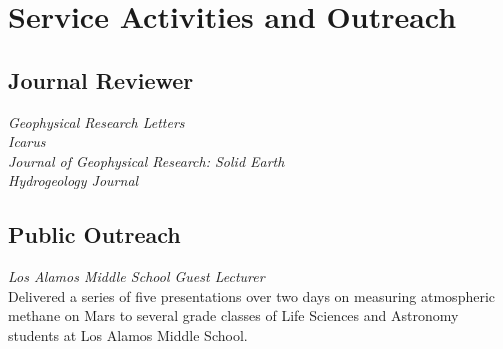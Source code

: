 \documentclass[11pt, letterpaper]{article}
\newcommand{\years}[1]{\marginnote{\scriptsize #1}}
\begin{document}
{{%

\section*{Service Activities and Outreach}

\hypersetup{linkcolor=black,citecolor=blue,filecolor=black,urlcolor=black}

% 




\subsection*{Journal Reviewer}

	\textit{Geophysical Research Letters}\\
	\textit{Icarus}\\
	\textit{Journal of Geophysical Research: Solid Earth}\\
	\textit{Hydrogeology Journal}



\subsection*{Public Outreach}
\setlength{\parskip}{0pt}
\noindent
\years{April 2024} \textit{Los Alamos Middle School Guest Lecturer}\\
Delivered a series of five presentations over two days on measuring
atmospheric methane on Mars to several  grade classes of Life Sciences
and Astronomy students at Los Alamos Middle School. \\ 

}}
\end{document}
